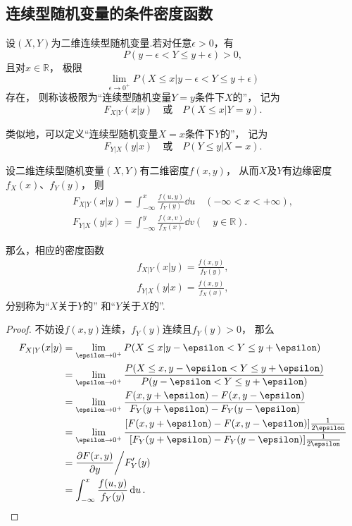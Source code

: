 \subsection{连续型随机变量的条件密度函数}
\begin{definition}
设\((X,Y)\)为二维连续型随机变量.若对任意\(\epsilon > 0\)，有\[
	P(y - \epsilon < Y \leq y + \epsilon) > 0,
\]
且对\(x\in\mathbb{R}\)，
极限\[
	\lim_{\epsilon\to0^+} P(X \leq x \vert y - \epsilon < Y \leq y + \epsilon)
\]存在，
则称该极限为“连续型随机变量\(Y=y\)条件下\(X\)的”，
记为\[
	F_{X \vert Y}(x \vert y)
	\quad\text{或}\quad
	P(X \leq x \vert Y = y).
\]

类似地，可以定义“连续型随机变量\(X=x\)条件下\(Y\)的”，
记为\[
	F_{Y \vert X}(y \vert x)
	\quad\text{或}\quad
	P(Y \leq y \vert X = x).
\]
\end{definition}

\begin{theorem}
设二维连续型随机变量\((X,Y)\)有二维密度\(f(x,y)\)，
从而\(X\)及\(Y\)有边缘密度\(f_X(x)\)、\(f_Y(y)\)，
则\begin{gather*}
	F_{X \vert Y}(x \vert y)
	= \int_{-\infty}^x \frac{f(u,y)}{f_Y(y)}\dd{u}
	\quad(-\infty < x < +\infty), \\
	F_{Y \vert X}(y \vert x)
	= \int_{-\infty}^y \frac{f(x,v)}{f_X(x)}\dd{v}
	(\quad y \in \mathbb{R}).
\end{gather*}

那么，相应的密度函数\begin{gather}
	f_{X \vert Y}(x \vert y)
	= \frac{f(x,y)}{f_Y(y)},
		\label{equation:多维随机变量及其分布.条件密度、联合密度、边缘密度的关系1} \\
	f_{Y \vert X}(y \vert x)
	= \frac{f(x,y)}{f_X(x)},
		\label{equation:多维随机变量及其分布.条件密度、联合密度、边缘密度的关系2}
\end{gather}
分别称为“\(X\)关于\(Y\)的”%
和“\(Y\)关于\(X\)的”.
\begin{proof}
不妨设\(f(x,y)\)连续，\(f_Y(y)\)连续且\(f_Y(y)>0\)，
\def\l{\lim_{\epsilon\to0^+}}%
那么\begin{align*}
	F_{X \vert Y}(x \vert y)
	&= \lim_{\epsilon\to0^+}
		P(X \leq x \vert y - \epsilon < Y \leq y + \epsilon) \\
	&= \lim_{\epsilon\to0^+}
		\frac{
			P(X \leq x, y - \epsilon < Y \leq y + \epsilon)
		}{
			P(y - \epsilon < Y \leq y + \epsilon)
		} \\
	&= \lim_{\epsilon\to0^+}
		\frac{
			F(x,y+\epsilon) - F(x,y-\epsilon)
		}{
			F_Y(y+\epsilon) - F_Y(y-\epsilon)
		} \\
	&= \lim_{\epsilon\to0^+}
		\frac{
			[F(x,y+\epsilon) - F(x,y-\epsilon)] \frac{1}{2 \epsilon}
		}{
			[F_Y(y+\epsilon) - F_Y(y-\epsilon)] \frac{1}{2 \epsilon}
		} \\
	&= \pdv{F(x,y)}{y} \bigg/ F_Y'(y) \\
	&= \int_{-\infty}^x \frac{f(u,y)}{f_Y(y)} \dd{u}.
	\qedhere
\end{align*}
\end{proof}
\end{theorem}


